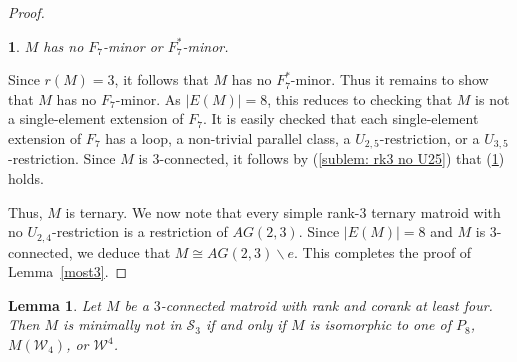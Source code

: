 \documentclass[11pt]{amsart}
\newtheorem{lemma}[theorem]{Lemma}
\newtheorem{sublemma}{}[theorem]
\numberwithin{equation}{section} %
\newcommand{\cS}{\mathcal{S}}
\newcommand{\cW}{\mathcal{W}}
\begin{document}
\begin{proof}
\begin{sublemma}
	\label{sublem: rk3 no F7}
	$M$ has no $F_7$-minor or $F_7^*$-minor.
\end{sublemma}

Since $r(M)=3$, it follows that $M$ has no $F_7^*$-minor. Thus it remains to show that $M$ has no $F_7$-minor. As $|E(M)|=8$, this reduces to checking that $M$ is not a single-element extension of $F_7$. It is easily checked that each single-element extension of $F_7$ has a loop, a non-trivial parallel class, a $U_{2, 5}$-restriction, or a $U_{3, 5}$-restriction. Since $M$ is $3$-connected, it follows by (\ref{sublem: rk3 no U25}) that (\ref{sublem: rk3 no F7}) holds.

Thus, $M$ is ternary. We now note that every simple rank-$3$ ternary matroid with no $U_{2, 4}$-restriction is a restriction of $AG(2, 3)$. Since $|E(M)|=8$ and $M$ is $3$-connected, we deduce that $M\cong  AG(2, 3)\backslash e$. This completes the proof of Lemma~\ref{most3}.
\end{proof}

\begin{lemma}
Let $M$ be a $3$-connected matroid with rank and corank at least four. Then $M$ is minimally not in $\cS_3$ if and only if $M$ is isomorphic to one of $P_8$, $M(\cW_4)$, or $\cW^4$.
\label{least4}
\end{lemma}
\end{document}
